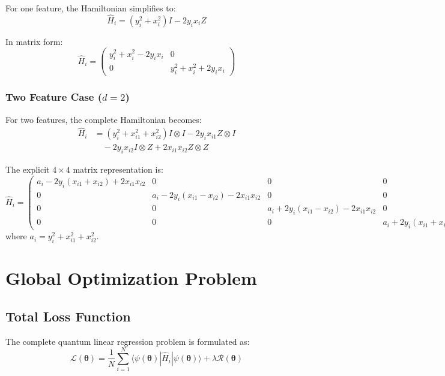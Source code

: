 \documentclass[11pt]{article}
\begin{document}
For one feature, the Hamiltonian simplifies to:
\begin{equation}
\hat{H}_i = (y_i^2 + x_i^2) I - 2y_i x_i Z
\label{eq:single_feature_hamiltonian}
\end{equation}

In matrix form:
\begin{equation}
\hat{H}_i = \begin{pmatrix}
y_i^2 + x_i^2 - 2y_i x_i & 0 \\
0 & y_i^2 + x_i^2 + 2y_i x_i
\end{pmatrix}
\end{equation}

\subsubsection{Two Feature Case ($d=2$)}

For two features, the complete Hamiltonian becomes:
\begin{align}
\hat{H}_i &= (y_i^2 + x_{i1}^2 + x_{i2}^2) I \otimes I - 2y_i x_{i1} Z \otimes I \\
&\quad - 2y_i x_{i2} I \otimes Z + 2x_{i1} x_{i2} Z \otimes Z
\end{align}

The explicit $4 \times 4$ matrix representation is:
\begin{equation}
\hat{H}_i = \begin{pmatrix}
a_i - 2y_i(x_{i1} + x_{i2}) + 2x_{i1}x_{i2} & 0 & 0 & 0 \\
0 & a_i - 2y_i(x_{i1} - x_{i2}) - 2x_{i1}x_{i2} & 0 & 0 \\
0 & 0 & a_i + 2y_i(x_{i1} - x_{i2}) - 2x_{i1}x_{i2} & 0 \\
0 & 0 & 0 & a_i + 2y_i(x_{i1} + x_{i2}) + 2x_{i1}x_{i2}
\end{pmatrix}
\label{eq:two_feature_matrix}
\end{equation}
where $a_i = y_i^2 + x_{i1}^2 + x_{i2}^2$.

\section{Global Optimization Problem}

\subsection{Total Loss Function}

The complete quantum linear regression problem is formulated as:
\begin{equation}
\mathcal{L}(\bm{\theta}) = \frac{1}{N} \sum_{i=1}^N \langle \psi(\bm{\theta}) | \hat{H}_i | \psi(\bm{\theta}) \rangle + \lambda \mathcal{R}(\bm{\theta})
\label{eq:total_loss}
\end{equation}
\end{document}
